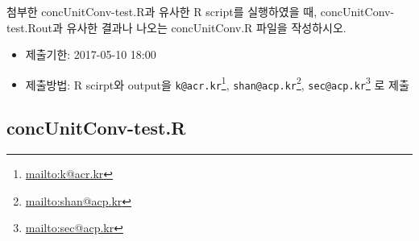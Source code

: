 \documentclass[10pt,]{krantz}
\providecommand{\tightlist}{%
  \setlength{\itemsep}{0pt}\setlength{\parskip}{0pt}}
\renewcommand{\href}[2]{#2\footnote{\url{#1}}}
\theoremstyle{definition}
\theoremstyle{definition}
\theoremstyle{remark}
\begin{document}
첨부한 concUnitConv-test.R과 유사한 R script를 실행하였을 때,
concUnitConv-test.Rout과 유사한 결과나 나오는 concUnitConv.R 파일을
작성하시오.

\begin{itemize}
\tightlist
\item
  제출기한: 2017-05-10 18:00
\item
  제출방법: R scirpt와 output을
  \href{mailto:k@acr.kr}{\nolinkurl{k@acr.kr}},
  \href{mailto:shan@acp.kr}{\nolinkurl{shan@acp.kr}},
  \href{mailto:sec@acp.kr}{\nolinkurl{sec@acp.kr}} 로 제출
\end{itemize}

\subsection{concUnitConv-test.R}\label{concunitconv-test.r}
\end{document}

